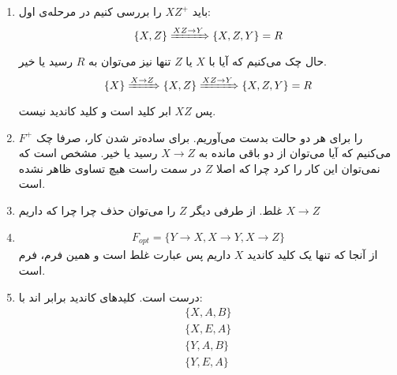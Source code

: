\begin{enumerate}
    \item باید
    $XZ^+$
    را بررسی کنیم در مرحله‌ی اول:
    \begin{gather*}
        \{X, Z\} \xRightarrow{XZ \rightarrow Y} \{X, Z, Y\} = R
    \end{gather*}
    حال چک می‌کنیم که آیا با
    $X$
    یا
    $Z$
    تنها نیز می‌توان به
    $R$
    رسید یا خیر.
    \begin{gather*}
        \{X\} \xRightarrow{X \rightarrow Z} \{X, Z\} \xRightarrow{XZ \rightarrow Y} \{X, Z, Y\} = R
    \end{gather*}
    پس
    $XZ$
    ابر کلید است و کلید کاندید نیست.
    \item $F^+$ را برای هر دو حالت بدست می‌آوریم.
    برای ساده‌تر شدن کار، صرفا چک می‌کنیم که آیا می‌توان از دو
    باقی مانده به
    $X \rightarrow Z$
    رسید یا خیر.
    مشخص است که نمی‌توان این کار را کرد چرا که اصلا
    $Z$
    در سمت راست هیچ تساوی ظاهر نشده است.
    \item غلط. از طرفی دیگر
    $Z$
    را می‌توان حذف چرا چرا که داریم
    $X \rightarrow Z$
    \item \begin{gather*}
        F_{opt} = \{Y \rightarrow X, X \rightarrow Y, X \rightarrow Z\}
    \end{gather*}
    از آنجا که تنها یک کلید کاندید
    $X$
    داریم پس عبارت غلط است و همین فرم، فرم
    است.
    \item درست است. کلید‌های کاندید برابر اند با:
    \begin{gather*}
        \{X, A, B\}\\
        \{X, E, A\}\\
        \{Y, A, B\}\\
        \{Y, E, A\}
    \end{gather*}
\end{enumerate}



